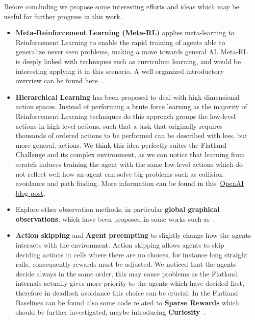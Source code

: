 \documentclass[11pt, a4paper, hidelinks]{report}
\begin{document}
Before concluding we propose some interesting efforts and ideas which may be useful for further progress in this work.
\begin{itemize}
	\item \textbf{Meta-Reinforcement Learning (Meta-RL)} applies meta-learning to Reinforcement Learning to enable the rapid training of agents able to generalize never seen problems, making a move towards general AI\@.
Meta-RL is deeply linked with techniques such as curriculum learning, and would be interesting applying it in this scenario.
A well organized introductory overview can be found here~\citep{weng2019metaRL}.
	\item \textbf{Hierarchical Learning} has been proposed to deal with high dimensional action spaces.
Instead of performing a brute force learning as the majority of Reinforcement Learning techniques do this approach groups the low-level actions in high-level actions, such that a task that originally requires thousands of ordered actions to be performed can be described with less, but more general, actions.
We think this idea perfectly suites the Flatland Challenge and its complex environment, as we can notice that learning from scratch induces training the agent with the same low-level actions which do not reflect well how an agent can solve big problems such as collision avoidance and path finding.
More information can be found in this~\href{https://openai.com/blog/learning-a-hierarchy/}{OpenAI blog post}.
	\item Explore other observation methods, in particular \textbf{global graphical observations}, which have been proposed in some works such as~\citep{Stanford2016MULTIAGENTDR}.
	\item \textbf{Action skipping} and \textbf{Agent preempting} to slightly change how the agents interacts with the environment.
Action skipping allows agents to skip deciding actions in cells where there are no choices, for instance long straight rails, consequently rewards must be adjusted.
We noticed that the agents decide always in the same order, this may cause problems as the Flatland internals actually gives more priority to the agents which have decided first, therefore in deadlock avoidance this choice can be crucial.
In the Flatland Baselines can be found also some code related to \textbf{Sparse Rewards} which should be further investigated, maybe introducing \textbf{Curiosity}~\citep{pathakICMl17curiosity}.
\end{itemize}

\newpage
\end{document}
